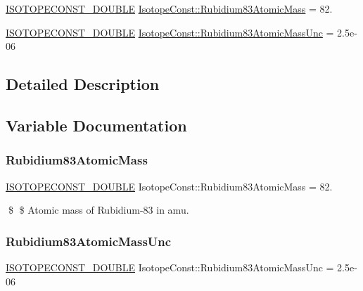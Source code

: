 \begin{DoxyCompactItemize}
\item 
\mbox{\hyperlink{group___isotope_const-_macros_ga8f45a7272ce02c0b4c65c44636ed719a}{I\+S\+O\+T\+O\+P\+E\+C\+O\+N\+S\+T\+\_\+\+D\+O\+U\+B\+LE}} \mbox{\hyperlink{group___isotope_const-_rubidium-_rb83_gaad93e58df14c4e4d9a7922c5893769a4}{Isotope\+Const\+::\+Rubidium83\+Atomic\+Mass}} = 82.
\item 
\mbox{\hyperlink{group___isotope_const-_macros_ga8f45a7272ce02c0b4c65c44636ed719a}{I\+S\+O\+T\+O\+P\+E\+C\+O\+N\+S\+T\+\_\+\+D\+O\+U\+B\+LE}} \mbox{\hyperlink{group___isotope_const-_rubidium-_rb83_ga23638b5762882804d010c611fc82b476}{Isotope\+Const\+::\+Rubidium83\+Atomic\+Mass\+Unc}} = 2.\+5e-\/06
\end{DoxyCompactItemize}


\subsection{Detailed Description}


\subsection{Variable Documentation}
\mbox{\label{group___isotope_const-_rubidium-_rb83_gaad93e58df14c4e4d9a7922c5893769a4}} 
\subsubsection{\texorpdfstring{Rubidium83\+Atomic\+Mass}{Rubidium83AtomicMass}}
{\footnotesize\ttfamily \mbox{\hyperlink{group___isotope_const-_macros_ga8f45a7272ce02c0b4c65c44636ed719a}{I\+S\+O\+T\+O\+P\+E\+C\+O\+N\+S\+T\+\_\+\+D\+O\+U\+B\+LE}} Isotope\+Const\+::\+Rubidium83\+Atomic\+Mass = 82.}

\$ \$ Atomic mass of Rubidium-\/83 in amu. \mbox{\label{group___isotope_const-_rubidium-_rb83_ga23638b5762882804d010c611fc82b476}} 
\subsubsection{\texorpdfstring{Rubidium83\+Atomic\+Mass\+Unc}{Rubidium83AtomicMassUnc}}
{\footnotesize\ttfamily \mbox{\hyperlink{group___isotope_const-_macros_ga8f45a7272ce02c0b4c65c44636ed719a}{I\+S\+O\+T\+O\+P\+E\+C\+O\+N\+S\+T\+\_\+\+D\+O\+U\+B\+LE}} Isotope\+Const\+::\+Rubidium83\+Atomic\+Mass\+Unc = 2.\+5e-\/06}

